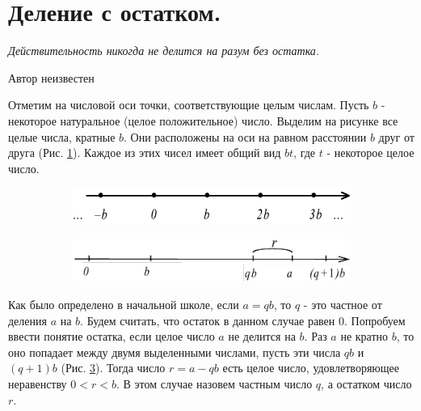 
\section{Деление с остатком.}

\epigraph{
\textit{Действительность никогда не делится на разум без остатка.
}}{Автор неизвестен}

Отметим на числовой оси точки, соответствующие целым числам. Пусть $b$ - некоторое натуральное (целое положительное) число. Выделим на рисунке все целые числа, кратные $b$. Они расположены на оси на равном расстоянии $b$ друг от друга (Рис. \ref{axis1}). Каждое из этих чисел имеет общий вид $bt$, где $t$ - некоторое целое число. 

\begin{figure}[h]
\begin{subfigure}{.5\textwidth}
  \centering
\includegraphics[width=.8\linewidth]{./img/axis1}
  \caption{}
  \label{axis1}
\end{subfigure}%
\begin{subfigure}{.5\textwidth}
  \centering
\includegraphics[width=.8\linewidth]{./img/axis2}
  \caption{}
  \label{axis2}
\end{subfigure}
  \caption{}
\end{figure}

Как было определено в начальной школе, если $a = qb$, то $q$ - это частное от деления $a$ на $b$. Будем считать, что остаток в данном случае равен $0$. Попробуем ввести понятие остатка, если целое число $a$ не делится на $b$. Раз $a$ не кратно $b$, то оно попадает между двумя выделенными числами, пусть эти числа $qb$ и $(q+1)b$ (Рис. \ref{axis2}). Тогда число $r = a - qb$ есть целое число, удовлетворяющее неравенству $0 < r < b$. В этом случае назовем частным число $q$, а остатком число $r$. 

